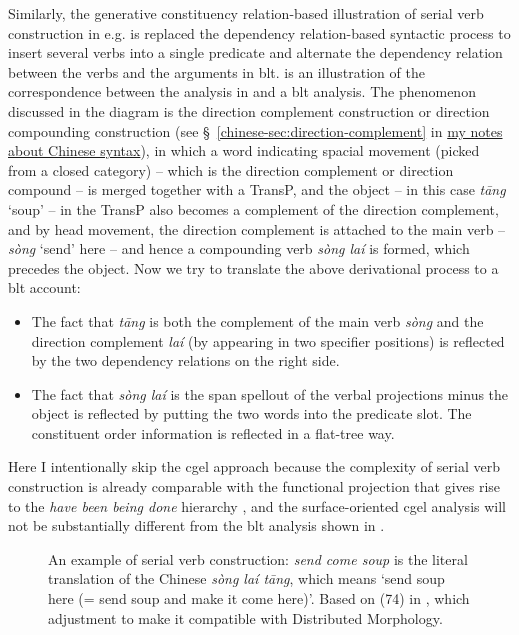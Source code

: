 \documentclass{article}
\newcommand*{\citesec}[1]{\S~{#1}}
\newcommand*{\corpus}[1]{\emph{#1}}
\newcommand{\chinese}{\href{../Chinese/main.pdf}{my notes about Chinese syntax}}
\begin{document}
Similarly, the generative constituency relation-based illustration 
of serial verb construction in e.g. \citet{chen2016mandarin}
is replaced the dependency relation-based syntactic process to insert several verbs into a single predicate 
and alternate the dependency relation between the verbs and the arguments in \ac{blt}.
 is an illustration of 
the correspondence between the analysis in \citet{chen2016mandarin} and a \ac{blt} analysis.
The phenomenon discussed in the diagram is the direction complement construction
or direction compounding construction 
(see \citesec{\ref{chinese-sec:direction-complement}} in \chinese),
in which a word indicating spacial movement (picked from a closed category) 
-- which is the direction complement or direction compound -- 
is merged together with a TransP,
and the object -- in this case \corpus{t\={a}ng} `soup' -- in the TransP
also becomes a complement of the direction complement,
and by head movement, the direction complement is attached to the main verb 
-- \corpus{s\`{o}ng} `send' here -- 
and hence a compounding verb \corpus{s\`{o}ng la\'{i}} is formed,
which precedes the object.
Now we try to translate the above derivational process to a \ac{blt} account:
\begin{itemize}
    \item The fact that \corpus{t\={a}ng} is both 
    the complement of the main verb \corpus{s\`{o}ng}
    and the direction complement \corpus{la\'{i}} 
    (by appearing in two specifier positions)
    is reflected by the two dependency relations 
    on the right side.
    \item The fact that \corpus{s\`{o}ng la\'{i}} is the span spellout of the verbal projections minus the object 
    is reflected by putting the two words into the predicate slot.
    The constituent order information is reflected in a flat-tree way.
\end{itemize}
Here I intentionally skip the \ac{cgel} approach 
because the complexity of serial verb construction
is already comparable with the functional projection 
that gives rise to the \corpus{have been being done} hierarchy
\citep{ramchand2014deriving},
and the surface-oriented \ac{cgel} analysis will not be substantially different 
from the \ac{blt} analysis shown in .

\begin{figure}
    \centering
    
    \caption{An example of serial verb construction: 
    \corpus{send come soup} is the literal translation of the Chinese \corpus{s\`{o}ng la\'{i} t\={a}ng},
    which means `send soup here (= send soup and make it come here)'.
    Based on (74) in \citet{chen2016mandarin},
    which adjustment to make it compatible with Distributed Morphology.}
    \label{fig:serial-verb-construction-1}
\end{figure}
\end{document}
